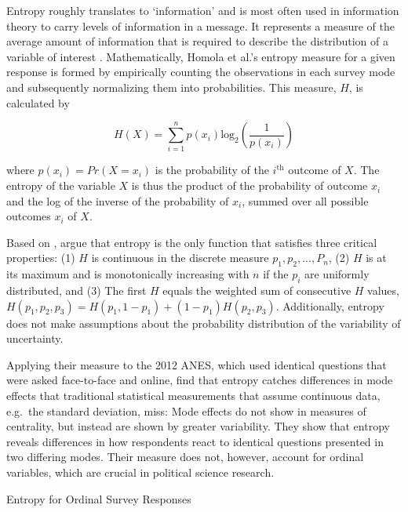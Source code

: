 \documentclass[12pt,]{article}
\makeatletter
\renewcommand\paragraph{\@startsection{paragraph}{4}{\z@}
                                    {-3.25ex \@plus -1ex \@minus -.2ex}
                                    {1.5ex \@plus .2ex}
                                    {\normalsize}} %
\makeatother
\begin{document}
Entropy roughly translates to `information' and is most often used in
information theory to carry levels of information in a message. It
represents a measure of the average amount of information that is
required to describe the distribution of a variable of interest
\citep{cover_1991_elements}. Mathematically, Homola et al.'s entropy
measure for a given response is formed by empirically counting the
observations in each survey mode and subsequently normalizing them into
probabilities. This measure, \(H\), is calculated by

\[H(X) = \sum\limits_{i=1}^{n} p(x_i) \text{log}_2 (\frac{1}{p(x_i)})\]

where \(p(x_i) = Pr(X=x_i)\) is the probability of the \(i^{\text{th}}\)
outcome of \(X\). The entropy of the variable \(X\) is thus the product
of the probability of outcome \(x_i\) and the log of the inverse of the
probability of \(x_i\), summed over all possible outcomes \(x_i\) of
\(X\).

Based on \citet{shannon_1948_mathematical}, \citet{homola_2016_measure}
argue that entropy is the only function that satisfies three critical
properties: (1) \(H\) is continuous in the discrete measure
\({p_1,p_2,...,P_n}\), (2) \(H\) is at its maximum and is monotonically
increasing with \(n\) if the \(p_i\) are uniformly distributed, and (3)
The first \(H\) equals the weighted sum of consecutive \(H\) values,
\(H(p_1,p_2,p_3) = H(p_1, 1-p_1) + (1 - p_1) H (p_2, p_3)\).
Additionally, entropy does not make assumptions about the probability
distribution of the variability of uncertainty.

Applying their measure to the 2012 ANES, which used identical questions
that were asked face-to-face and online, \citet{homola_2016_measure}
find that entropy catches differences in mode effects that traditional
statistical measurements that assume continuous data, e.g.~the standard
deviation, miss: Mode effects do not show in measures of centrality, but
instead are shown by greater variability. They show that entropy reveals
differences in how respondents react to identical questions presented in
two differing modes. Their measure does not, however, account for
ordinal variables, which are crucial in political science research.

\paragraph{Entropy for Ordinal Survey
Responses}\label{mode-theory-entropy-ordinal}
\end{document}
